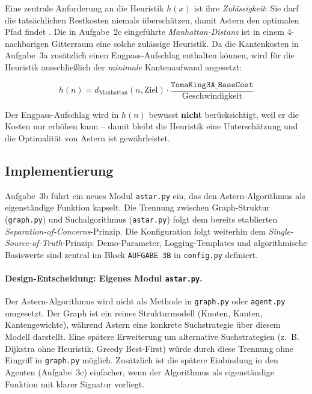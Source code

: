 Eine zentrale Anforderung an die Heuristik \(h(x)\) ist ihre \textit{Zulässigkeit}: Sie darf die tatsächlichen Restkosten niemals überschätzen, damit \acs{Astern} den optimalen Pfad findet \cite[S. 21\,ff.]{5}. Die in Aufgabe~2c eingeführte \textit{Manhattan-Distanz} ist in einem 4-nachbarigen Gitterraum eine solche zulässige Heuristik. Da die Kantenkosten in Aufgabe~3a zusätzlich einen Engpass-Aufschlag enthalten können, wird für die Heuristik ausschließlich der \textit{minimale} Kantenaufwand angesetzt:

\[
h(n) = d_{\text{Manhattan}}(n, \text{Ziel}) \cdot \frac{\texttt{TomaKing3A\_BaseCost}}{\text{Geschwindigkeit}}
\]

Der Engpass-Aufschlag wird in \(h(n)\) bewusst \textbf{nicht} berücksichtigt, weil er die Kosten nur erhöhen kann -- damit bleibt die Heuristik eine Unterschätzung und die Optimalität von \acs{Astern} ist gewährleistet.

\subsection{Implementierung}

Aufgabe~3b führt ein neues Modul \texttt{astar.py} ein, das den \acs{Astern}-Algorithmus als eigenständige Funktion kapselt. Die Trennung zwischen Graph-Struktur (\texttt{graph.py}) und Suchalgorithmus (\texttt{astar.py}) folgt dem bereits etablierten \textit{Separation-of-Concerns}-Prinzip. Die Konfiguration folgt weiterhin dem \textit{Single-Source-of-Truth}-Prinzip: Demo-Parameter, Logging-Templates und algorithmische Basiswerte sind zentral im Block \texttt{AUFGABE 3B} in \texttt{config.py} definiert.

\paragraph{Design-Entscheidung: Eigenes Modul \texttt{astar.py}.}
Der \acs{Astern}-Algorithmus wird nicht als Methode in \texttt{graph.py} oder \texttt{agent.py} umgesetzt. Der Graph ist ein reines Strukturmodell (Knoten, Kanten, Kantengewichte), während \acs{Astern} eine konkrete Suchstrategie über diesem Modell darstellt. Eine spätere Erweiterung um alternative Suchstrategien (z.~B. Dijkstra ohne Heuristik, Greedy Best-First) würde durch diese Trennung ohne Eingriff in \texttt{graph.py} möglich. Zusätzlich ist die spätere Einbindung in den Agenten (Aufgabe~3c) einfacher, wenn der Algorithmus als eigenständige Funktion mit klarer Signatur vorliegt.


